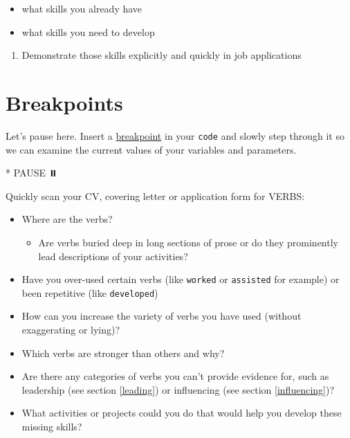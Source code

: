 \documentclass[
]{book}
\newenvironment{Shaded}{\begin{snugshade}}{\end{snugshade}}
\newcommand{\NormalTok}[1]{#1}
\newcommand{\SpecialStringTok}[1]{\textcolor[rgb]{0.31,0.60,0.02}{#1}}
\providecommand{\tightlist}{%
  \setlength{\itemsep}{0pt}\setlength{\parskip}{0pt}}
\begin{document}
\begin{itemize}
\tightlist
\item
  what skills you already have
\item
  what skills you need to develop
\end{itemize}

\begin{enumerate}
\def\labelenumi{\arabic{enumi}.}
\tightlist
\item
  Demonstrate those skills explicitly and quickly in job applications
\end{enumerate}

\hypertarget{bp17}{%
\section{Breakpoints}\label{bp17}}

Let's pause here. Insert a \href{https://en.wikipedia.org/wiki/Breakpoint}{breakpoint} in your \texttt{code} and slowly step through it so we can examine the current values of your variables and parameters.

\begin{Shaded}
\begin{Highlighting}[]
\SpecialStringTok{* }\NormalTok{PAUSE ⏸️}
\end{Highlighting}
\end{Shaded}

Quickly scan your CV, covering letter or application form for VERBS:

\begin{itemize}
\tightlist
\item
  Where are the verbs?

  \begin{itemize}
  \tightlist
  \item
    Are verbs buried deep in long sections of prose or do they prominently lead descriptions of your activities?
  \end{itemize}
\item
  Have you over-used certain verbs (like \texttt{worked} or \texttt{assisted} for example) or been repetitive (like \texttt{developed})
\item
  How can you increase the variety of verbs you have used (without exaggerating or lying)?
\item
  Which verbs are stronger than others and why?
\item
  Are there any categories of verbs you can't provide evidence for, such as leadership (see section \ref{leading}) or influencing (see section \ref{influencing})?
\item
  What activities or projects could you do that would help you develop these missing skills?
\end{itemize}
\end{document}

